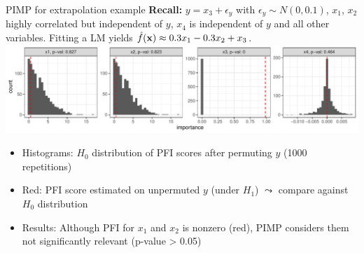 \documentclass[11pt,compress,t,notes=noshow, aspectratio=169, xcolor=table]{beamer}
\begin{document}
\begin{frame}{PIMP for extrapolation example}
\textbf{Recall:} 
$y = x_3 + \epsilon_y$ with $\epsilon_y \sim N(0, 0.1)$, 
$x_1$, $x_2$ highly correlated but independent of $y$, 
$x_4$ is independent of $y$ and all other variables.
Fitting a LM yields $\fh(\xv) \approx 0.3 x_1 - 0.3 x_2 + x_3$.
%
  \includegraphics[width=\linewidth]{figure_man/pimp.pdf}

\begin{itemize}
    \item Histograms: $H_0$ distribution of PFI scores after permuting $y$ (1000 repetitions)
    \item Red: PFI score estimated on unpermuted $y$ (under $H_1$) $\leadsto$ compare against $H_0$ distribution
    \item Results: Although PFI for $x_1$ and $x_2$ is nonzero (red), PIMP considers them not significantly relevant (p-value > 0.05) 
\end{itemize}
\end{frame}
\end{document}
